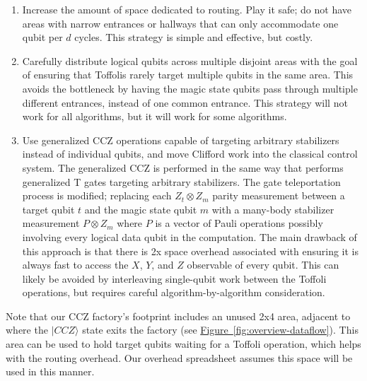 \documentclass[superscriptaddress,notitlepage,longbibliography]{revtex4-1}
\newcommand{\fig}[1]{\hyperref[fig:#1]{Figure~\ref*{fig:#1}}}
\begin{document}
\begin{enumerate}
\item
    Increase the amount of space dedicated to routing.
    Play it safe; do not have areas with narrow entrances or hallways that can only accommodate one qubit per $d$ cycles.
    This strategy is simple and effective, but costly.
\item
    Carefully distribute logical qubits across multiple disjoint areas with the goal of ensuring that Toffolis rarely target multiple qubits in the same area.
    This avoids the bottleneck by having the magic state qubits pass through multiple different entrances, instead of one common entrance.
    This strategy will not work for all algorithms, but it will work for some algorithms.
\item
    Use generalized CCZ operations capable of targeting arbitrary stabilizers instead of individual qubits, and move Clifford work into the classical control system.
    The generalized CCZ is performed in the same way that \cite{litinski2018} performs generalized T gates targeting arbitrary stabilizers.
    The gate teleportation process is modified; replacing each $Z_t \otimes Z_m$ parity measurement between a target qubit $t$ and the magic state qubit $m$ with a many-body stabilizer measurement $P \otimes Z_m$ where $P$ is a vector of Pauli operations possibly involving every logical data qubit in the computation.
    The main drawback of this approach is that there is 2x space overhead associated with ensuring it is always fast to access the $X$, $Y$, and $Z$ observable of every qubit.
    This can likely be avoided by interleaving single-qubit work between the Toffoli operations, but requires careful algorithm-by-algorithm consideration.
\end{enumerate}

Note that our CCZ factory's footprint includes an unused 2x4 area, adjacent to where the $|CCZ\rangle$ state exits the factory (see \fig{overview-dataflow}).
This area can be used to hold target qubits waiting for a Toffoli operation, which helps with the routing overhead. Our overhead spreadsheet assumes this space will be used in this manner.
\end{document}
